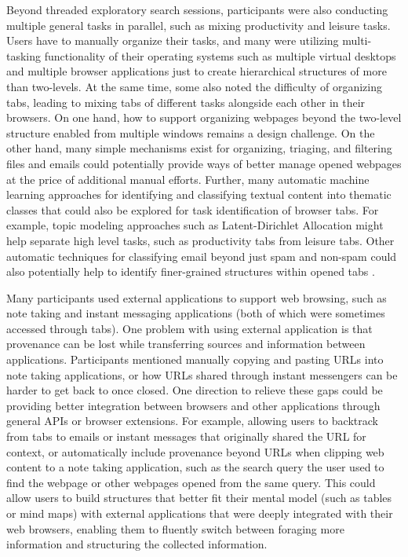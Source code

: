 Beyond threaded exploratory search sessions, participants were also conducting multiple general tasks in parallel, such as mixing productivity and leisure tasks. Users have to manually organize their tasks, and many were utilizing multi-tasking functionality of their operating systems such as multiple virtual desktops and multiple browser applications just to create hierarchical structures of more than two-levels. At the same time, some also noted the difficulty of organizing tabs, leading to mixing tabs of different tasks alongside each other in their browsers. On one hand, how to support organizing webpages beyond the two-level structure enabled from multiple windows remains a design challenge. On the other hand, many simple mechanisms exist for organizing, triaging, and filtering files and emails could potentially provide ways of better manage opened webpages at the price of additional manual efforts. Further, many automatic machine learning approaches for identifying and classifying textual content into thematic classes that could also be explored for task identification of browser tabs. For example, topic modeling approaches such as Latent-Dirichlet Allocation \cite{blei2003latent} might help separate high level tasks, such as productivity tabs from leisure tabs. Other automatic techniques for classifying email beyond just spam and non-spam could also potentially help to identify finer-grained structures within opened tabs  \cite{dabbish2005understanding,kannan2016smart}.


Many participants used external applications to support web browsing, such as note taking and instant messaging applications (both of which were sometimes accessed through tabs). One problem with using external application is that provenance can be lost while transferring sources and information between applications. Participants mentioned manually copying and pasting URLs into note taking applications, or how URLs shared through instant messengers can be harder to get back to once closed. One direction to relieve these gaps could be providing better integration between browsers and other applications through general APIs or browser extensions. For example, allowing users to backtrack from tabs to emails or instant messages that originally shared the URL for context, or automatically include provenance beyond URLs when clipping web content to a note taking application, such as the search query the user used to find the webpage or other webpages opened from the same query. This could allow users to build structures that better fit their mental model (such as tables or mind maps) with external applications that were deeply integrated with their web browsers, enabling them to fluently switch between foraging more information and structuring the collected information.

